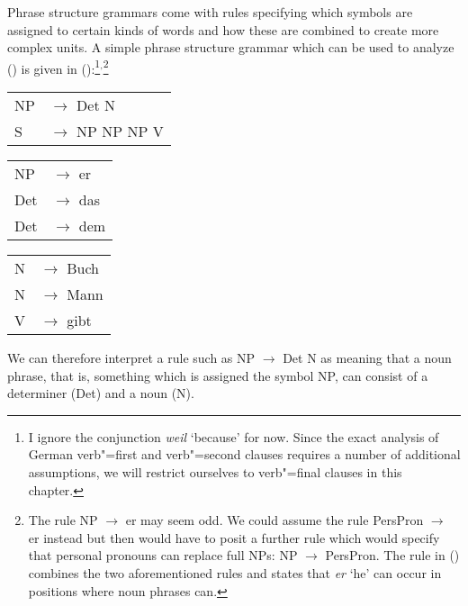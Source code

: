 Phrase structure grammars come with rules specifying which symbols are assigned to certain kinds of words and how these are combined to create more
complex units. A simple phrase structure grammar which can be used to analyze () is given in ():\footnote{
	I ignore the conjunction \emph{weil} `because' for now. Since the exact analysis of
        German verb"=first and verb"=second clauses requires a number of additional assumptions, we will restrict ourselves to verb"=final clauses in this chapter.
}$^,$\footnote{\label{fn-np-pron-ps-rule}%
	The rule NP $\to$ er may seem odd. We could assume the rule PersPron $\to$ er instead but then would have to posit a further rule which
	would specify that personal pronouns can replace full NPs: NP $\to$ PersPron. The rule in () combines the two aforementioned rules and states
	that \emph{er} `he' can occur in positions where noun phrases can.
}
\ea
\label{bsp-grammatik-psg}
\begin{tabular}[t]{@{}l@{ }l}
{NP} & {$\to$ Det N}\\          
{S}  & {$\to$ NP NP NP V}
\end{tabular}\hspace{2cm}%
\begin{tabular}[t]{@{}l@{ }l}
{NP} & {$\to$ er}\\
{Det}  & {$\to$ das}\\
{Det}  & {$\to$ dem}\\
\end{tabular}\hspace{8mm}
\begin{tabular}[t]{@{}l@{ }l}
{N} & {$\to$ Buch}\\
{N} & {$\to$ Mann}\\
{V} & {$\to$ gibt}\\
\end{tabular}
\z
We can therefore interpret a rule such as NP $\to$\is{$\to$} Det N as meaning that a noun phrase, that is, something which is assigned the symbol NP, can consist
of a determiner (Det) and a noun (N).


